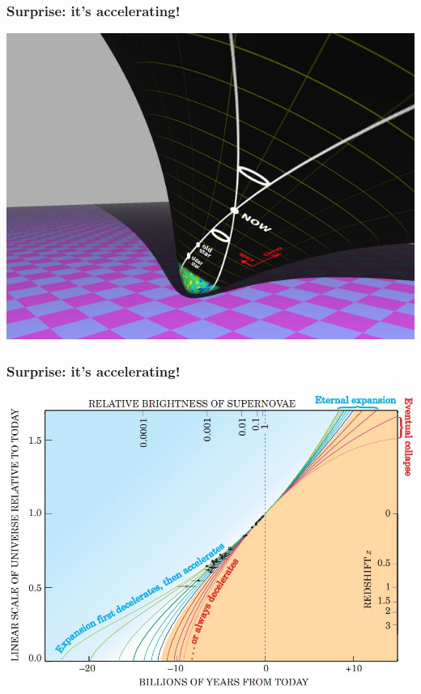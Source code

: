 \documentclass[compress]{beamer}
\begin{document}
\begin{frame}
\frametitle{Surprise: it's accelerating!}
\begin{center}
\includegraphics[width=0.95\linewidth]{pictures/newinflation.png}
\end{center}
\end{frame}

\begin{frame}
\frametitle{Surprise: it's accelerating!}
\begin{center}
\includegraphics[width=\linewidth]{pictures/physicstoday_expansion.jpg}
\end{center}
\end{frame}
\end{document}
